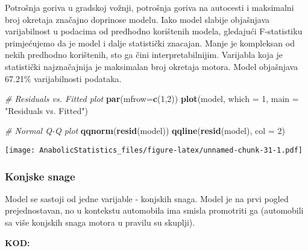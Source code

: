 \documentclass[
]{article}
\newenvironment{Shaded}{\begin{snugshade}}{\end{snugshade}}
\newcommand{\AttributeTok}[1]{\textcolor[rgb]{0.13,0.29,0.53}{#1}}
\newcommand{\CommentTok}[1]{\textcolor[rgb]{0.56,0.35,0.01}{\textit{#1}}}
\newcommand{\DecValTok}[1]{\textcolor[rgb]{0.00,0.00,0.81}{#1}}
\newcommand{\FunctionTok}[1]{\textcolor[rgb]{0.13,0.29,0.53}{\textbf{#1}}}
\newcommand{\NormalTok}[1]{#1}
\newcommand{\OtherTok}[1]{\textcolor[rgb]{0.56,0.35,0.01}{#1}}
\newcommand{\SpecialCharTok}[1]{\textcolor[rgb]{0.81,0.36,0.00}{\textbf{#1}}}
\newcommand{\StringTok}[1]{\textcolor[rgb]{0.31,0.60,0.02}{#1}}
\begin{document}
Potrošnja goriva u gradskoj vožnji, potrošnja goriva na autocesti i
maksimalni broj okretaja značajno doprinose modelu. Iako model slabije
objašnjava varijabilnost u podacima od predhodno korištenih modela,
gledajući F-statistiku primjećujemo da je model i dalje statistički
znacajan. Manje je kompleksan od nekih predhodno korištenih, sto ga čini
interpretabilnijim. Varijabla koja je statistički najznačajnija je
maksimalan broj okretaja motora. Model objašnjava 67.21\% varijabilnosti
podataka.

\begin{Shaded}
\begin{Highlighting}[]
\CommentTok{\# Residuals vs. Fitted plot}
\FunctionTok{par}\NormalTok{(}\AttributeTok{mfrow=}\FunctionTok{c}\NormalTok{(}\DecValTok{1}\NormalTok{,}\DecValTok{2}\NormalTok{))}
\FunctionTok{plot}\NormalTok{(model, }\AttributeTok{which =} \DecValTok{1}\NormalTok{, }\AttributeTok{main =} \StringTok{"Residuals vs. Fitted"}\NormalTok{)}

\CommentTok{\# Normal Q{-}Q plot}
\FunctionTok{qqnorm}\NormalTok{(}\FunctionTok{resid}\NormalTok{(model))}
\FunctionTok{qqline}\NormalTok{(}\FunctionTok{resid}\NormalTok{(model), }\AttributeTok{col =} \DecValTok{2}\NormalTok{)}
\end{Highlighting}
\end{Shaded}

\texttt{[image: AnabolicStatistics\_files/figure-latex/unnamed-chunk-31-1.pdf]}

\subsubsection{Konjske snage}\label{konjske-snage}

Model se sastoji od jedne varijable - konjskih snaga. Model je na prvi
pogled prejednostavan, no u kontekstu automobila ima smisla promotriti
ga (automobili sa više konjskih snaga motora u pravilu su skuplji).

\textbf{KOD:}

\begin{Shaded}
\end{Shaded}
\end{document}
